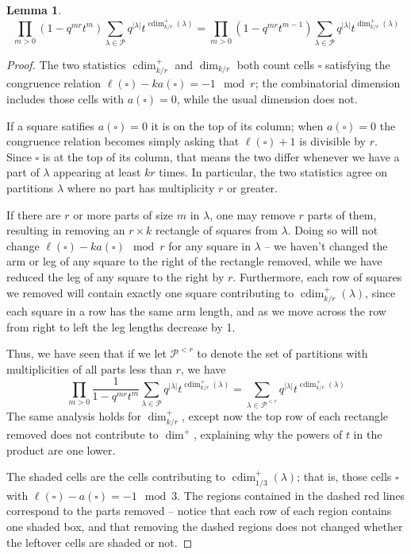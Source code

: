 \documentclass{amsart}[12pt]
\theoremstyle{definition}
\newtheorem{lemma}[dummy]{Lemma}
\newcommand{\PP}{\mathcal{P}} %
\DeclareMathOperator{\cdim}{cdim}
\begin{document}
\begin{lemma}
$$\prod_{m>0}(1-q^{mr}t^m)\sum_{\lambda\in\PP} q^{|\lambda|}t^{\cdim^+_{k/r}(\lambda)}=\prod_{m>0} (1-q^{mr}t^{m-1}) \sum_{\lambda\in\PP} q^{|\lambda|}t^{\dim^+_{k/r}(\lambda)}$$
\end{lemma}
\begin{proof}
The two statistics $\cdim^+_{k/r}$ and $\dim_{k/r}$ both count cells $\square$ satisfying the congruence relation $\ell(\square)-ka(\square)=-1\mod r$; the combinatorial dimension includes those cells with $a(\square)=0$, while the usual dimension does not.  

If a square satifies $a(\square)=0$ it is on the top of its column; when $a(\square)=0$ the congruence relation becomes simply asking that $\ell(\square)+1$ is divisible by $r$. Since $\square$ is at the top of its column, that means the two differ whenever we have a part of $\lambda$ appearing at least $kr$ times.  In particular, the two statistics agree on partitions $\lambda$ where no part has multiplicity $r$ or greater.

If there are $r$ or more parts of size $m$ in $\lambda$, one may remove $r$ parts of them, resulting in removing an $r\times k$ rectangle of squares from $\lambda$.  Doing so will not change $\ell(\square)-ka(\square)\mod r$ for any square in $\lambda$ -- we haven't changed the arm or leg of any square to the right of the rectangle removed, while we have reduced the leg of any square to the right by $r$.  Furthermore, each row of squares we removed will contain exactly one square contributing to $\cdim^+_{k/r}(\lambda)$, since each square in a row has the same arm length, and as we move across the row from right to left the leg lengths decrease by 1.  

Thus, we have seen that if we let $\PP^{<r}$ to denote the set of partitions with multiplicities of all parts less than $r$, we have
$$\prod_{m>0}\frac{1}{1-q^{mr}t^m}\sum_{\lambda\in\PP} q^{|\lambda|}t^{\cdim^+_{k/r}(\lambda)}=\sum_{\lambda\in\PP^{<r}}q^{|\lambda|}t^{\cdim^+_{k/r}(\lambda)}$$
The same analysis holds for $\dim^+_{k/r}$, except now the top row of each rectangle removed does not contribute to $\dim^+$, explaining why the powers of $t$ in the product are one lower.

The shaded cells are the cells contributing to $\cdim^+_{1/3}(\lambda)$; that is, those cells $\square$ with $\ell(\square)-a(\square)=-1\mod 3$.  The regions contained in the dashed red lines correspond to the parts removed -- notice that each row of each region contains one shaded box, and that removing the dashed regions does not changed whether the leftover cells are shaded or not.



\end{proof}
\end{document}
